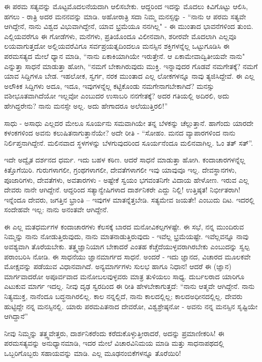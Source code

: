 ಈ ಪರಮ ಸತ್ಯವನ್ನು ಮೊಟ್ಟಮೊದಲನೆಯದಾಗಿ ಆಲಿಸಬೇಕು. ಆದ್ದರಿಂದ ಇದನ್ನು ಮೊದಲು ಕಿವಿಗೊಟ್ಟು ಆಲಿಸಿ, ಹಗಲು - ರಾತ್ರಿ ಅದರ ಮನನವನ್ನು ಮಾಡಿ. ಅಹೋರಾತ್ರಿ ಸದಾ ನಿಮ್ಮ ಮನಸ್ಸನ್ನು - “ನಾನು ಆ ಪರಮ ಸತ್ಯವೇ ಆಗಿದ್ದೇನೆ, ನಾನು ವಿಶ್ವದ ವಿಭುವಾಗಿದ್ದೇನೆ, ಯಾವ ಭ್ರಮೆಯೂ ನನಗಿಲ್ಲ" - ಈ ಮುಂತಾದ ಭಾವನೆಗಳಿಂದ ತುಂಬಿ. ಎಲ್ಲಿಯವರೆಗೂ ಈ ಗೋಡೆಗಳು, ಮನೆಗಳು, ಪ್ರತಿಯೊಂದೂ ವಿಲೀನವಾಗಿ, ಶರೀರವೇ ಮೊದಲಾಗಿ ಎಲ್ಲವೂ ಲಯವಾಗುತ್ತದೋ ಅಲ್ಲಿಯವರೆವಿಗೂ ಸರ್ವಪ್ರಯತ್ನದಿಂದಲೂ ಮನಸ್ಸಿನ ಶಕ್ತಿಗಳನ್ನೆಲ್ಲ ಒಟ್ಟುಗೂಡಿಸಿ ಈ ಪರಮಸತ್ಯದ ಮೇಲೆ ಧ್ಯಾನ ಮಾಡಿ, “ನಾನು ಏಕಾಕಿಯಾಗಿಯೇ ಇರುತ್ತೇನೆ. ಆ ಏಕಾಮೇವಾದ್ವಿತೀಯವೇ ನಾನು" ಎನ್ನುತ್ತಾ ಸಾಧನೆ ಮಾಡುತ್ತಾ ಹೋಗಿ, “ನಮಗೆ ಬೇಕಾಗಿರುವುದು ಮುಕ್ತಿ. ಇನ್ನಾವುದರ ಗೊಡವೆ ನಮಗೇತಕ್ಕೆ? ನಮಗೆ ಯಾವ ಸಿದ್ದಿಗಳೂ ಬೇಡ. ಇಹಲೋಕ, ಸ್ವರ್ಗ, ನರಕ ಮುಂತಾದ ಎಲ್ಲ ಲೋಕಗಳನ್ನೂ ನಾವು ತ್ಯಜಿಸಿದ್ದೇವೆ. ಈ ಎಲ್ಲ ಅಲೌಕಿಕ ಸಿದ್ದಿಗಳು ಅದೂ, ಇದೂ, ಇವುಗಳನ್ನೆಲ್ಲ ಕಟ್ಟಿಕೊಂಡು ನಮಗೇನಾಗಬೇಕಾಗಿದೆ? ಮನಸ್ಸು ವಶೀಭೂತವಾಗಿದೆಯೋ ಇಲ್ಲವೋ ಎಂಬುದರ ಉಸಾಬರಿ ನನಗೇತಕ್ಕೆ? ಅದರ ಗತಿಯಲ್ಲಿ ಅದಿರಲಿ, ಅದು ಹೇಗಿದ್ದರೇನು? ನಾನು ಮನಸ್ಸೇ ಅಲ್ಲ. ಅದು ಹೇಗಾದರೂ ಅಲೆಯುತ್ತಿರಲಿ!”

ಸಾಧು - ಅಸಾಧು ಎಲ್ಲದರ ಮೇಲೂ ಸೂರ್ಯನು ಸಮವಾಗಿಯೇ ತನ್ನ ಬೆಳಕನ್ನು ಚೆಲ್ಲುತ್ತಾನೆ. ಹಾಗೆಂದು ಯಾರದೇ ಕಳಂಕಗಳಿಂದ ಅವನು ಕಲುಷಿತನಾಗುತ್ತಾನೆಯೇ? ಅದೇ ರೀತಿ - “ಸೋಹಂ. ಮನದ ವ್ಯಾಪಾರಗಳಿಂದ ನಾನು ನಿರ್ಲಿಪ್ತನಾಗಿದ್ದೇನೆ. ಮಲಿನವಾದ ಸ್ಥಳಗಳನ್ನು ಬೆಳಗುವುದರಿಂದ ಸೂರ್ಯನೆಂದೂ ಮಲಿನವಾಗಿಲ್ಲ. ಓಂ ತತ್ ಸತ್”.

ಇದೇ ಅದ್ವೈತ ದರ್ಶನದ ಧರ್ಮ. ಇದು ಬಹಳ ಕಠಿಣ. ಆದರೆ ಸಾಧನೆ ಮಾಡುತ್ತಾ ಹೋಗಿ. ಕಂದಾಚಾರಗಳನ್ನೆಲ್ಲ ಕಿತ್ತೊಗೆಯಿರಿ. ಗುರುಗಳಾಗಲೀ, ಗ್ರಂಥಗಳಾಗಲೀ, ದೇವತೆಗಳಾಗಲೀ ಇವು ಯಾವುವೂ ಇಲ್ಲ. ದೇವಸ್ಥಾನಗಳು, ಪೂಜಾರಿಗಳು, ದೇವತೆಗಳು, ಅವತಾರಗಳು - ಅಷ್ಟೇಕೆ ಸ್ವಯಂ ಭಗವಂತನಿಗೇ ವಿದಾಯ ಹೇಳೋಣ. ಇರುವ ಎಲ್ಲ ದೇವರು ನಾನೇ ಆಗಿದ್ದೇನೆ. ಆದ್ದರಿಂದ ಸತ್ಯಾನ್ವೇಷಿಗಳಾದ ದಾರ್ಶನಿಕರೇ ಎದ್ದು ನಿಲ್ಲಿ! ಉತ್ತಿಷ್ಠತ! ನಿರ್ಭೀತರಾಗಿ! ಇನ್ನೆಂದೂ ದೇವರು, ಜಗತ್ತಿನ ಭ್ರಾಂತಿ – ಇವುಗಳ ಮಾತನ್ನೆತ್ತಬೇಡಿ. ಸತ್ಯಮೇವ ಜಯತೇ! ಎಂಬುದು ದಿಟ. ಇದರಲ್ಲಿ ಸಂದೇಹವೇ ಇಲ್ಲ: ನಾನು ಅನಂತವೇ ಆಗಿದ್ದೇನೆ.

ಈ ಎಲ್ಲ ಮತಧರ್ಮಗಳ ಕಂದಾಚಾರಗಳು ಕೆಲಸಕ್ಕೆ ಬಾರದ ಮನೋವಿಕಲ್ಪಗಳಷ್ಟೇ. ಈ ಸಭೆ, ನನ್ನ ಮುಂದಿರುವ ನಿಮ್ಮನ್ನು ನಾನು ನೋಡುತ್ತಿರುವುದು, ನಾನು ಮಾತನಾಡುತ್ತಿರುವುದು - ಇವೆಲ್ಲ ಭ್ರಮೆಯಷ್ಟೇ. ಇವೆಲ್ಲವನ್ನೂ ನಾವು ಅವಶ್ಯವಾಗಿ ತೊರೆಯಬೇಕು. ತತ್ತ್ವಜ್ಞಾನಿಯಾಗ ಬೇಕಾದರೆ ಎಂತಹ ಕೆಚ್ಚೆದೆಯುಳ್ಳವರಾಗಿರಬೇಕು ಎಂಬುದನ್ನು ಸ್ವಲ್ಪ ಪರಾಂಬರಿಸಿ ನೋಡಿ. ಈ ಸಾಧನೆಯು ಜ್ಞಾನಮಾರ್ಗದ ಸಾಧನೆ. ಅಂದರೆ - ಇದು ಜ್ಞಾನದ, ವಿಚಾರದ ಮೂಲಕವೇ ಮೋಕ್ಷವನ್ನು ಪಡೆಯುವ ವಿಧಾನವಾಗಿದೆ. ಅನ್ಯಮಾರ್ಗಗಳು ಸುಲಭ ಹಾಗೂ ನಿಧಾನ! ಆದರೆ ಈ (ಜ್ಞಾನ) ಮಾರ್ಗವಾದರೋ ಅಪೂರ್ವವಾದ ಮನೋಬಲವುಳ್ಳವರು ಮಾತ್ರ ತುಳಿಯಲು ಸಾಧ್ಯ. ದುರ್ಬಲರಾದ ಯಾರಿಗೂ ಎಟುಕುವ ಮಾರ್ಗ ಇದಲ್ಲ. ನೀವು ದೃಢ ಸ್ವರದಿಂದ ಈ ರೀತಿ ಹೇಳಬೇಕಾಗುತ್ತದೆ: “ನಾನು ಆತ್ಮವೇ ಆಗಿದ್ದೇನೆ. ನಾನು ನಿತ್ಯಮುಕ್ತ, ನಾನೆಂದೂ ಬದ್ಧನಾಗಿರಲಿಲ್ಲ. ಕಾಲ ನನ್ನಲ್ಲಿದೆ, ನಾನು ಕಾಲದಲ್ಲಿಲ್ಲ; ಕಾಲದ\break ಅಧೀನದಲ್ಲಿಲ್ಲ. ದೇವರು ಹುಟ್ಟಿದ್ದೇ ನನ್ನ ಮನಸ್ಸಿನಲ್ಲಿ. ಯಾರು ಪರಮಪಿತನಾದ ದೇವರೋ, ವಿಶ್ವಶ್ರೇಷ್ಠನೋ - ಅವನು ನನ್ನ ಮನಸ್ಸಿನ ಸೃಷ್ಟಿಯೇ ಆಗಿದ್ದಾನೆ''

ನೀವು ನಿಮ್ಮನ್ನು ತತ್ತ್ವವೇತ್ತರು, ದಾರ್ಶನಿಕರೆಂದು ಕರೆದುಕೊಳ್ಳುತ್ತೀರಾದರೆ, ಅದನ್ನು ಪ್ರಮಾಣೀಕರಿಸಿ! ಈ ಪರಮಸತ್ಯವನ್ನು ಅನುಧ್ಯಾನಮಾಡಿ, ಇದರ ಮೇಲೆ ವಿಚಾರವಿನಿಮಯ ಮಾಡಿ ಮತ್ತು ಸಾಧನಾಪಥದಲ್ಲಿ ಒಬ್ಬರಿಗೊಬ್ಬರು ಸಹಾಯವನ್ನು ಮಾಡಿ. ಎಲ್ಲ ಮೂಢನಂಬಿಕೆಗಳನ್ನೂ ತೊರೆಯಿರಿ!

